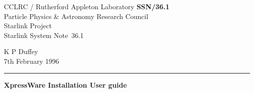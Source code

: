 \documentclass[11pt]{article}
\newcommand{\stardoccategory}  {Starlink System Note}
\newcommand{\stardocinitials}  {SSN}
\newcommand{\stardocnumber}    {36.1}
\newcommand{\stardocauthors}   {K P Duffey}
\newcommand{\stardocdate}      {7th February 1996}
\newcommand{\stardoctitle}     {XpressWare Installation User guide}
\newcommand{\stardocname}{\stardocinitials /\stardocnumber}
\newenvironment{latexonly}{}{}
\begin{document}
\thispagestyle{empty}

\begin{latexonly}
   CCLRC / {\sc Rutherford Appleton Laboratory} \hfill {\bf \stardocname}\\
   {\large Particle Physics \& Astronomy Research Council}\\
   {\large Starlink Project\\}
   {\large \stardoccategory\ \stardocnumber}
   \begin{flushright}
   \stardocauthors\\
   \stardocdate
   \end{flushright}
   \vspace{-4mm}
   \rule{\textwidth}{0.5mm}
   \vspace{5mm}
   \begin{center}
   {\Large\bf \stardoctitle}
   \end{center}
   \vspace{5mm}

\end{latexonly}
\end{document}

